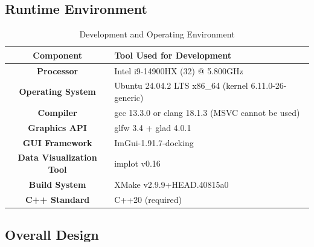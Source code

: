 \documentclass{article}
\begin{document}
\subsection{Runtime Environment}
\begin{table}[H]
    \centering
    \caption{Development and Operating Environment}
    \begin{tabular}{@{}>{\bfseries}c>{\raggedright\arraybackslash}p{10cm}@{}} %
        \toprule
        \textbf{Component}      & \textbf{Tool Used for Development}                    \\
        \midrule
        Processor               & Intel i9-14900HX (32) @ 5.800GHz                      \\
        Operating System        & Ubuntu 24.04.2 LTS x86\_64 (kernel 6.11.0-26-generic) \\
        Compiler                & gcc 13.3.0 or clang 18.1.3 (MSVC cannot be used)      \\
        Graphics API            & glfw 3.4 + glad 4.0.1                                 \\
        GUI Framework           & ImGui-1.91.7-docking                                  \\
        Data Visualization Tool & implot v0.16                                          \\
        Build System            & XMake v2.9.9+HEAD.40815a0                             \\
        C++ Standard            & C++20 (required)                                      \\
        \bottomrule
    \end{tabular}
\end{table}
\subsection{Overall Design}
\end{document}
